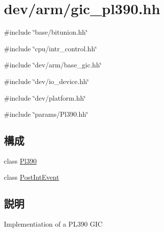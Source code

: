 \hypertarget{gic__pl390_8hh}{
\section{dev/arm/gic\_\-pl390.hh}
\label{gic__pl390_8hh}
}
{\ttfamily \#include \char`\"{}base/bitunion.hh\char`\"{}}\par
{\ttfamily \#include \char`\"{}cpu/intr\_\-control.hh\char`\"{}}\par
{\ttfamily \#include \char`\"{}dev/arm/base\_\-gic.hh\char`\"{}}\par
{\ttfamily \#include \char`\"{}dev/io\_\-device.hh\char`\"{}}\par
{\ttfamily \#include \char`\"{}dev/platform.hh\char`\"{}}\par
{\ttfamily \#include \char`\"{}params/Pl390.hh\char`\"{}}\par
\subsection*{構成}
\begin{DoxyCompactItemize}
\item 
class \hyperlink{classPl390}{Pl390}
\item 
class \hyperlink{classPl390_1_1PostIntEvent}{PostIntEvent}
\end{DoxyCompactItemize}


\subsection{説明}
Implementiation of a PL390 GIC 